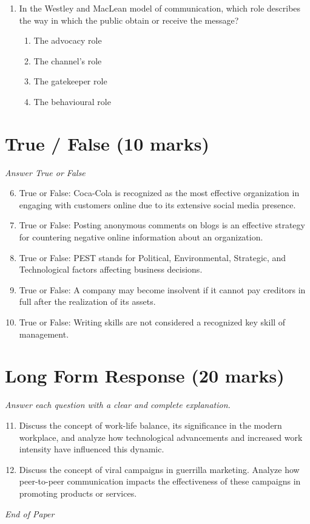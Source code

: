 \documentclass[12pt]{article}
\begin{document}
\begin{enumerate}[label=\arabic*.]
\begin{enumerate}[label=(\alph*)]
    \item Conceptual equivalence.
    \item Market equivalence.
    \item Functional equivalence.
    \item Translation equivalence.
\end{enumerate}
\item In the Westley and MacLean model of communication, which role describes the way in which the public obtain or receive the message?
\begin{enumerate}[label=(\alph*)]
    \item The advocacy role
    \item The channel's role
    \item The gatekeeper role
    \item The behavioural role
\end{enumerate}
\end{enumerate}

\section*{True / False (10 marks)}
\textit{Answer True or False}
\begin{enumerate}[label=\arabic*.]
\setcounter{enumi}{5}
\item True or False: Coca-Cola is recognized as the most effective organization in engaging with customers online due to its extensive social media presence.
\item True or False: Posting anonymous comments on blogs is an effective strategy for countering negative online information about an organization.
\item True or False: PEST stands for Political, Environmental, Strategic, and Technological factors affecting business decisions.
\item True or False: A company may become insolvent if it cannot pay creditors in full after the realization of its assets.
\item True or False: Writing skills are not considered a recognized key skill of management.
\end{enumerate}

\section*{Long Form Response (20 marks)}
\textit{Answer each question with a clear and complete explanation.}
\begin{enumerate}[label=\arabic*.]
\setcounter{enumi}{10}
\item Discuss the concept of work-life balance, its significance in the modern workplace, and analyze how technological advancements and increased work intensity have influenced this dynamic.
\item Discuss the concept of viral campaigns in guerrilla marketing. Analyze how peer-to-peer communication impacts the effectiveness of these campaigns in promoting products or services.
\end{enumerate}

\vfill
\noindent\textit{End of Paper}
\end{document}
